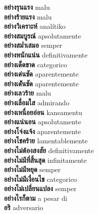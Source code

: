 \textbf{ อย่างรุนแรง  } malu \\
\textbf{ อย่างร้ายแรง  } malu \\
\textbf{ อย่างวิเคราะห์  } analítiko \\
\textbf{ อย่างสมบูรณ์  } apsolutamente \\
\textbf{ อย่างสม่ำเสมอ  } semper \\
\textbf{ อย่างหนักแน่น  } definitivamente \\
\textbf{ อย่างเด็ดขาด  } categorico \\
\textbf{ อย่างเด่นชัด  } aparentemente \\
\textbf{ อย่างเด่ันชัด  } aparentemente \\
\textbf{ อย่างเลวร้าย  } malu \\
\textbf{ อย่างเลื่อมใส  } admirando \\
\textbf{ อย่างเหนื่อยอ่อน  } kansamentu \\
\textbf{ อย่างแน่นอน  } apsolutamente \\
\textbf{ อย่างโจ่งแจ้ง  } aparentemente \\
\textbf{ อย่างโชคร้าย  } lamentablemente \\
\textbf{ อย่างไม่ต้องสงสัย  } definitivamente \\
\textbf{ อย่างไม่มีที่สิ้นสุด  } infinitamente \\
\textbf{ อย่างไม่มีหยุด  } semper \\
\textbf{ อย่างไม่มีเงื่อนไข  } categorico \\
\textbf{ อย่างไม่เปลี่ยนแปลง  } semper \\
\textbf{ อย่างไรก็ตาม  } a pesar di \\
\textbf{ อริ  } adversario \\
